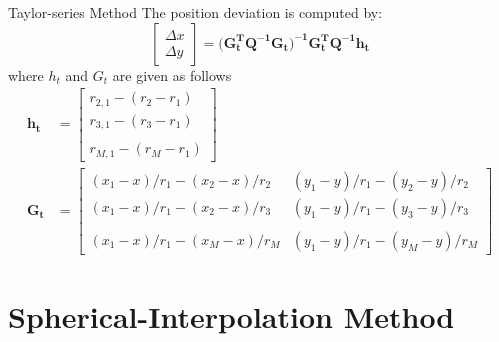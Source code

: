 \documentclass[10pt]{beamer}
\begin{document}
\begin{frame}{Taylor-series Method}
	The position deviation is computed by:
   $$\begin{bmatrix} \Delta x \\ \Delta y \end{bmatrix} = (\mathbf{G_{t}^T Q^{-1} G_{t})^{-1} G_{t}^T Q^{-1} h_{t}}$$
  where $h_{t}$ and $G_{t}$ are given as follows
 \begin{align}
    \mathbf{h_{t}} &= \begin{bmatrix} r_{2,1} - (r_{2}-r_{1}) \\  r_{3,1} - (r_{3}-r_{1})\\  \quad\\  r_{M,1} - (r_{M}-r_{1}) \end{bmatrix}  \\
    \mathbf{G_{t}} &= \begin{bmatrix} (x_{1}-x)/r_{1} - (x_{2}-x)/r_{2} & (y_{1}-y)/r_{1} - (y_{2}-y)/r_{2} \\ (x_{1}-x)/r_{1} - (x_{2}-x)/r_{3} & (y_{1}-y)/r_{1} - (y_{3}-y)/r_{3}\\  \quad\\ (x_{1}-x)/r_{1} - (x_{M}-x)/r_{M} & (y_{1}-y)/r_{1} - (y_{M}-y)/r_{M} \end{bmatrix}
  \end{align}

\end{frame}

\section{Spherical-Interpolation Method}
\end{document}

